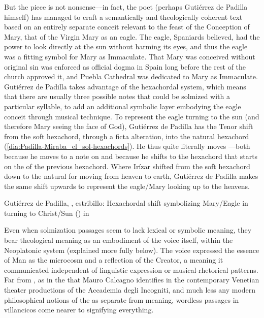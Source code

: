 But the piece is not nonsense---in fact, the poet (perhaps Gutiérrez de Padilla
himself) has managed to craft a semantically and theologically coherent text
based on an entirely separate conceit relevant to the feast of the Conception
of Mary, that of the Virgin Mary as an eagle.
The eagle, Spaniards believed, had the power to look directly at the sun
without harming its eyes, and thus the eagle was a fitting symbol for Mary as
Immaculate.%
    \Autocite[]{Covarrubias:Tesoro} %
That Mary was conceived without original sin was enforced as official dogma in
Spain long before the rest of the church approved it, and Puebla Cathedral was
dedicated to Mary as Immaculate.
Gutiérrez de Padilla takes advantage of the hexachordal system, which means
that there are usually three possible notes that could be solmized with a
particular syllable, to add an additional symbolic layer embodying the eagle
conceit through musical technique.
To represent the eagle turning to the sun (and therefore Mary seeing the face
of God), Gutiérrez de Padilla has the Tenor shift from the soft hexachord,
through a ficta alteration, into the natural hexachord
(\cref{dia:Padilla-Miraba_el_sol-hexachords}).
He thus quite literally moves ---both because he moves to a
note on  and because he shifts to the hexachord that starts on the
 of the previous hexachord.
Where Irízar shifted from the soft hexachord down to the natural for moving from
heaven to earth, Gutiérrez de Padilla makes the same shift upwards to represent
the eagle/Mary looking up to the heavens.

{Gutiérrez de Padilla, , estribillo: Hexachordal shift
symbolizing Mary/Eagle in  turning to
Christ/Sun () in }

Even when solmization passages seem to lack lexical or symbolic meaning, they
bear theological meaning as an embodiment of the voice itself, within the
Neoplatonic system (explained more fully below).
The voice expressed the essence of Man as the microcosm and a reflection of the
Creator, a meaning it communicated independent of linguistic expression or
musical-rhetorical patterns.
Far from , as in the  that Mauro Calcagno identifies in the contemporary Venetian theater
productions of the Accademia degli Incogniti, and much less any modern
philosophical notions of the  as separate from meaning,
wordless passages in villancicos come nearer to signifying everything.%
    \Autocites
    {Calcagno:SignifyingNothing}
    {Feldman:Voice}
    {Barthes:GrainOfVoice}
    {Dolar:Voice}
    {Cavarero:Voice}


